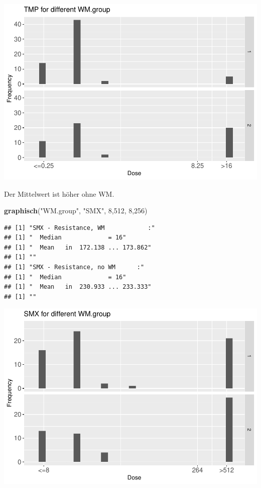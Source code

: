\documentclass[
]{article}
\newenvironment{Shaded}{\begin{snugshade}}{\end{snugshade}}
\newcommand{\DecValTok}[1]{\textcolor[rgb]{0.00,0.00,0.81}{#1}}
\newcommand{\KeywordTok}[1]{\textcolor[rgb]{0.13,0.29,0.53}{\textbf{#1}}}
\newcommand{\NormalTok}[1]{#1}
\newcommand{\StringTok}[1]{\textcolor[rgb]{0.31,0.60,0.02}{#1}}
\begin{document}
\includegraphics{Verteilungen_files/figure-latex/unnamed-chunk-42-1.pdf}

Der Mittelwert ist höher ohne WM.

\begin{Shaded}
\begin{Highlighting}[]
  \KeywordTok{graphisch}\NormalTok{(}\StringTok{"WM.group"}\NormalTok{, }\StringTok{"SMX"}\NormalTok{, }\DecValTok{8}\NormalTok{,}\DecValTok{512}\NormalTok{, }\DecValTok{8}\NormalTok{,}\DecValTok{256}\NormalTok{) }
\end{Highlighting}
\end{Shaded}

\begin{verbatim}
## [1] "SMX - Resistance, WM            :"
## [1] "  Median             = 16"
## [1] "  Mean   in  172.138 ... 173.862"
## [1] ""
## [1] "SMX - Resistance, no WM      :"
## [1] "  Median             = 16"
## [1] "  Mean   in  230.933 ... 233.333"
## [1] ""
\end{verbatim}

\includegraphics{Verteilungen_files/figure-latex/unnamed-chunk-43-1.pdf}
\end{document}
